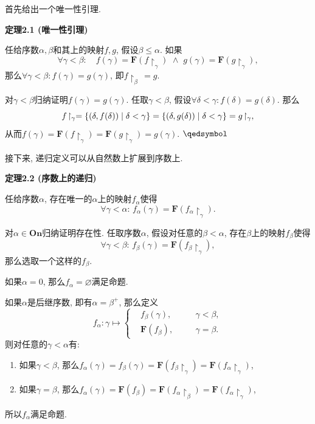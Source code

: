 \documentclass[UTF8]{ctexart}
\begin{document}
首先给出一个唯一性引理.

\vspace{10pt}

\hypertarget{sec:定理2.1}{}
\noindent\textbf{定理2.1 (唯一性引理)}

任给序数$\alpha,\beta$和其上的映射$f,g$, 假设$\beta\leqslant\alpha$. 如果
\[
    \forall\gamma<\beta:\quad f(\gamma)=\mathbf{F}(f\!\restriction_\gamma)
    \,\,\land\,\,g(\gamma)=\mathbf{F}(g\!\restriction_\gamma),
\]
那么$\forall\gamma<\beta:f(\gamma)=g(\gamma)$, 即$f\!\restriction_\beta\,=g$.


对$\gamma<\beta$归纳证明$f(\gamma)=g(\gamma)$.
任取$\gamma<\beta$, 假设$\forall\delta<\gamma:f(\delta)=g(\delta)$. 那么
\vspace{3pt}
\[
    f\!\restriction_\gamma=\{(\delta,f(\delta))\mid\delta<\gamma\}=
    \{(\delta,g(\delta))\mid\delta<\gamma\}=g\!\restriction_\gamma,\\[3pt]
\]
从而$f(\gamma)=\mathbf{F}(f\!\restriction_\gamma)
=\mathbf{F}(g\!\restriction_\gamma)=g(\gamma)$. \hfill $\qedsymbol$





\newpage

接下来, 递归定义可以从自然数上扩展到序数上.

\vspace{10pt}

\hypertarget{sec:定理2.2}{}
\noindent\textbf{定理2.2 (序数上的递归)}

任给序数$\alpha$, 存在唯一的$\alpha$上的映射$f_\alpha$使得
\[
    \forall\gamma<\alpha:\,
    f_\alpha(\gamma)=\mathbf{F}(f_\alpha\!\restriction_\gamma).
\]



对$\alpha\in\mathbf{On}$归纳证明存在性.
任取序数$\alpha$, 假设对任意的$\beta<\alpha$, 存在$\beta$上的映射$f_\beta$使得
\[
    \forall\gamma<\beta:\,
    f_\beta(\gamma)=\mathbf{F}(f_\beta\!\restriction_\gamma),
\]
那么选取一个这样的$f_\beta$.

\vspace{3pt}
如果$\alpha=0$, 那么$f_\alpha=\varnothing$满足命题.

如果$\alpha$是后继序数, 即有$\alpha=\beta^+$, 那么定义
\[f_\alpha:\gamma\mapsto\left\{\begin{aligned}
    &f_\beta(\gamma),\quad&&\gamma<\beta,\\[-3pt]
    &\mathbf{F}(f_\beta),\quad&&\gamma=\beta.
\end{aligned}\right.\]
则对任意的$\gamma<\alpha$有:
\begin{enumerate}
    \item 如果$\gamma<\beta$, 那么$f_\alpha(\gamma)=f_\beta(\gamma)=
    \mathbf{F}(f_\beta\!\restriction_\gamma)=
    \mathbf{F}(f_\alpha\!\restriction_\gamma)$,
    \vspace{1pt}
    \item 如果$\gamma=\beta$, 那么$f_\alpha(\gamma)=\mathbf{F}(f_\beta)=
    \mathbf{F}(f_\alpha\!\restriction_\beta)=
    \mathbf{F}(f_\alpha\!\restriction_\gamma)$,
\end{enumerate}
所以$f_\alpha$满足命题.
\end{document}
